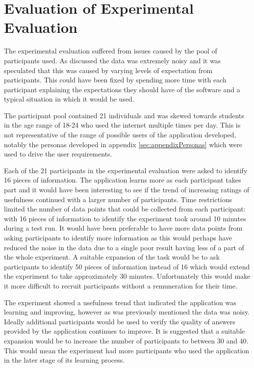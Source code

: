 \documentclass[authoryearcitations]{UoYCSproject}
\begin{document}
\section{Evaluation of Experimental Evaluation}
\label{sec:evalExperimentalEvaluation}

The experimental evaluation suffered from issues caused by the pool of participants used. As discussed the data was extremely noisy and it was speculated that this was caused by varying levels of expectation from participants. This could have been fixed by spending more time with each participant explaining the expectations they should have of the software and a typical situation in which it would be used. 

The participant pool contained 21 individuals and was skewed towards students in the age range of 18-24 who used the internet multiple times per day. This is not representative of the range of possible users of the application developed, notably the personas developed in appendix \ref{sec:appendixPersonas} which were used to drive the user requirements.

Each of the 21 participants in the experimental evaluation were asked to identify 16 pieces of information. The application learns more as each participant takes part and it would have been interesting to see if the trend of increasing ratings of usefulness continued with a larger number of participants. Time restrictions limited the number of data points that could be collected from each participant: with 16 pieces of information to identify the experiment took around 10 minutes during a test run. It would have been preferable to have more data points from asking participants to identify more information as this would perhaps have reduced the noise in the data due to a single poor result having less of a part of the whole experiment. A suitable expansion of the task would be to ask participants to identify 50 pieces of information instead of 16 which would extend the experiment to take approximately 30 minutes. Unfortunately this would make it more difficult to recruit participants without a remuneration for their time.

The experiment showed a usefulness trend that indicated the application was learning and improving, however as was previously mentioned the data was noisy. Ideally additional participants would be used to verify the quality of answers provided by the application continues to improve. It is suggested that a suitable expansion would be to increase the number of participants to between 30 and 40. This would mean the experiment had more participants who used the application in the later stage of its learning process.
\end{document}
